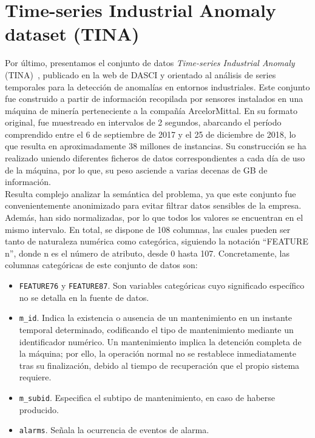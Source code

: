 \section{Time-series Industrial Anomaly dataset (TINA)}

Por último, presentamos el conjunto de datos \textit{Time-series Industrial Anomaly} (TINA)~\cite{tina_dasci_arcelor}, publicado en la web de DASCI y orientado al análisis de series temporales para la detección de anomalías en entornos industriales. Este conjunto fue construido a partir de información recopilada por sensores instalados en una máquina de minería perteneciente a la compañía ArcelorMittal. En su formato original, fue muestreado en intervalos de 2 segundos, abarcando el período comprendido entre el 6 de septiembre de 2017 y el 25 de diciembre de 2018, lo que resulta en aproximadamente 38 millones de instancias. Su construcción se ha realizado uniendo diferentes ficheros de datos correspondientes a cada día de uso de la máquina, por lo que, su peso asciende a varias decenas de GB de información.\\

Resulta complejo analizar la semántica del problema, ya que este conjunto fue convenientemente anonimizado para evitar filtrar datos sensibles de la empresa. Además, han sido normalizadas, por lo que todos los valores se encuentran en el mismo intervalo. En total, se dispone de 108 columnas, las cuales pueden ser tanto de naturaleza numérica como categórica, siguiendo la notación ``FEATURE n'', donde n es el número de atributo, desde 0 hasta 107. Concretamente, las columnas categóricas de este conjunto de datos son:

\begin{itemize}
	\item \texttt{FEATURE76} y \texttt{FEATURE87}. Son variables categóricas cuyo significado específico no se detalla en la fuente de datos.
	\item \texttt{m\_id}. Indica la existencia o ausencia de un mantenimiento en un instante temporal determinado, codificando el tipo de mantenimiento mediante un identificador numérico. Un mantenimiento implica la detención completa de la máquina; por ello, la operación normal no se restablece inmediatamente tras su finalización, debido al tiempo de recuperación que el propio sistema requiere.
	\item \texttt{m\_subid}. Especifica el subtipo de mantenimiento, en caso de haberse producido.
	\item \texttt{alarms}. Señala la ocurrencia de eventos de alarma.
\end{itemize}



